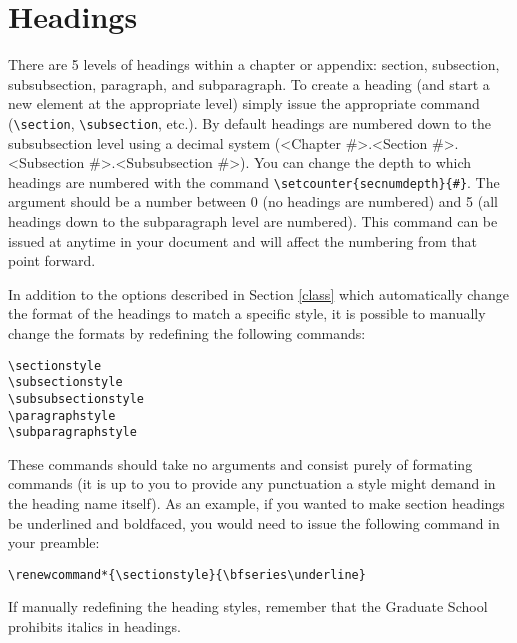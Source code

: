 \section{Headings}
There are 5 levels of headings within a chapter or appendix: section, subsection, subsubsection, paragraph, and subparagraph.  To create a heading (and start a new element at the appropriate level) simply issue the appropriate command (\verb=\section=, \verb=\subsection=, etc.).  By default headings are numbered down to the subsubsection level using a decimal system (<Chapter \#>.<Section \#>.<Sub\-sec\-tion \#>.<Sub\-sub\-sec\-tion \#>).  You can change the depth to which headings are numbered with the command \verb=\setcounter{secnumdepth}{#}=.  The argument should be a number between 0 (no headings are numbered) and 5 (all headings down to the subparagraph level are numbered).  This command can be issued at anytime in your document and will affect the numbering from that point forward.

In addition to the options described in Section \ref{class} which automatically change the format of the headings to match a specific style, it is possible to manually change the formats by redefining the following commands:
\begin{verbatim}
\sectionstyle
\subsectionstyle
\subsubsectionstyle
\paragraphstyle
\subparagraphstyle
\end{verbatim}
These commands should take no arguments and consist purely of formating commands (it is up to you to provide any punctuation a style might demand in the heading name itself).  As an example, if you wanted to make section headings be underlined and boldfaced, you would need to issue the following command in your preamble:
\begin{verbatim}
\renewcommand*{\sectionstyle}{\bfseries\underline}
\end{verbatim}
If manually redefining the heading styles, remember that the Graduate School prohibits italics in headings.

